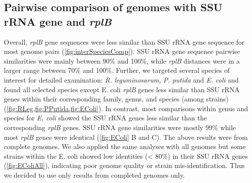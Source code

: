 \documentclass[]{msu-thesis}
\begin{document}
\subsection{Pairwise comparison of genomes with SSU rRNA gene and \textit{rplB}}
Overall, \textit{rplB} gene sequences were less similar than SSU rRNA gene sequence for most genome pairs (\cref{fig:interSpeciesComp}). SSU rRNA gene sequence pairwise similarities were mainly between 90\% and 100\%, while \textit{rplB} distances were in a larger range between 70\% and 100\%. Further, we targeted several species of interest for detailed examination: \textit{R. leguminosarum}, \textit{P. putida} and \textit{E. coli} and found all selected species except E. coli \textit{rplB} genes less similar than SSU rRNA genes within their corresponding family, genus, and species (among strains) (\cref{fig:RLeg,fig:PPutida,fig:EColi}). In contrast, most comparisons within genus and species for \textit{E. coli} showed the SSU rRNA genes less similar than the corresponding \textit{rplB} genes. SSU rRNA gene similarities were mostly 99\% while most \textit{rplB} genes were identical (\cref{fig:EColi} B and C). The above results were from complete genomes. We also applied the same analyses with all genomes but some strains within the E. coli showed low identities (< 80\%) in their SSU rRNA genes (\cref{fig:EColiAll}), indicating poor genome quality or strain mis-identification. Thus we decided to use only results from completed genomes only.
\end{document}
